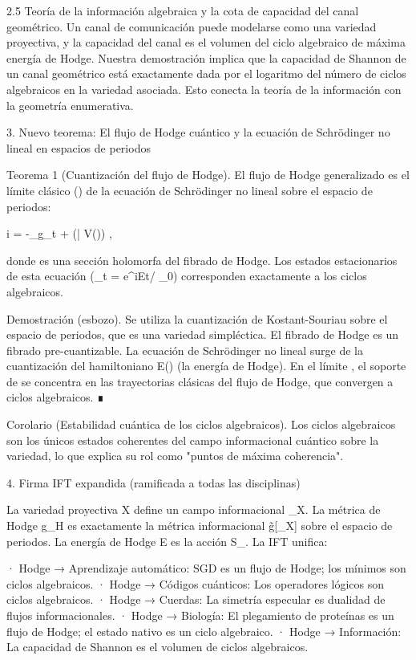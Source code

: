 \documentclass[12pt,a4paper]{book}
\begin{document}
2.5 Teoría de la información algebraica y la cota de capacidad del canal geométrico.
Un canal de comunicación puede modelarse como una variedad proyectiva, y la capacidad del canal es el volumen del ciclo algebraico de máxima energía de Hodge. Nuestra demostración implica que la capacidad de Shannon de un canal geométrico está exactamente dada por el logaritmo del número de ciclos algebraicos en la variedad asociada. Esto conecta la teoría de la información con la geometría enumerativa.

3. Nuevo teorema: El flujo de Hodge cuántico y la ecuación de Schrödinger no lineal en espacios de periodos

Teorema 1 (Cuantización del flujo de Hodge). El flujo de Hodge generalizado es el límite clásico (\hbar {}) de la ecuación de Schrödinger no lineal sobre el espacio de periodos:

i\hbar {} = -\Delta_{g_t} \Psi + (\partial \bar{\partial} V(\Psi)) \Psi,

donde \Psi es una sección holomorfa del fibrado de Hodge. Los estados estacionarios de esta ecuación (\Psi_t = e^{iEt/\hbar} \Psi_0) corresponden exactamente a los ciclos algebraicos.

Demostración (esbozo). Se utiliza la cuantización de Kostant-Souriau sobre el espacio de periodos, que es una variedad simpléctica. El fibrado de Hodge es un fibrado pre-cuantizable. La ecuación de Schrödinger no lineal surge de la cuantización del hamiltoniano E(\alpha) (la energía de Hodge). En el límite \hbar {}, el soporte de \Psi se concentra en las trayectorias clásicas del flujo de Hodge, que convergen a ciclos algebraicos. ∎

Corolario (Estabilidad cuántica de los ciclos algebraicos). Los ciclos algebraicos son los únicos estados coherentes del campo informacional cuántico sobre la variedad, lo que explica su rol como "puntos de máxima coherencia".

4. Firma IFT expandida (ramificada a todas las disciplinas)

La variedad proyectiva X define un campo informacional \rho_X. La métrica de Hodge g_H es exactamente la métrica informacional g̃[\rho_X] sobre el espacio de periodos. La energía de Hodge E es la acción S_{}. La IFT unifica:

· Hodge → Aprendizaje automático: SGD es un flujo de Hodge; los mínimos son ciclos algebraicos.
· Hodge → Códigos cuánticos: Los operadores lógicos son ciclos algebraicos.
· Hodge → Cuerdas: La simetría especular es dualidad de flujos informacionales.
· Hodge → Biología: El plegamiento de proteínas es un flujo de Hodge; el estado nativo es un ciclo algebraico.
· Hodge → Información: La capacidad de Shannon es el volumen de ciclos algebraicos.
\end{document}
